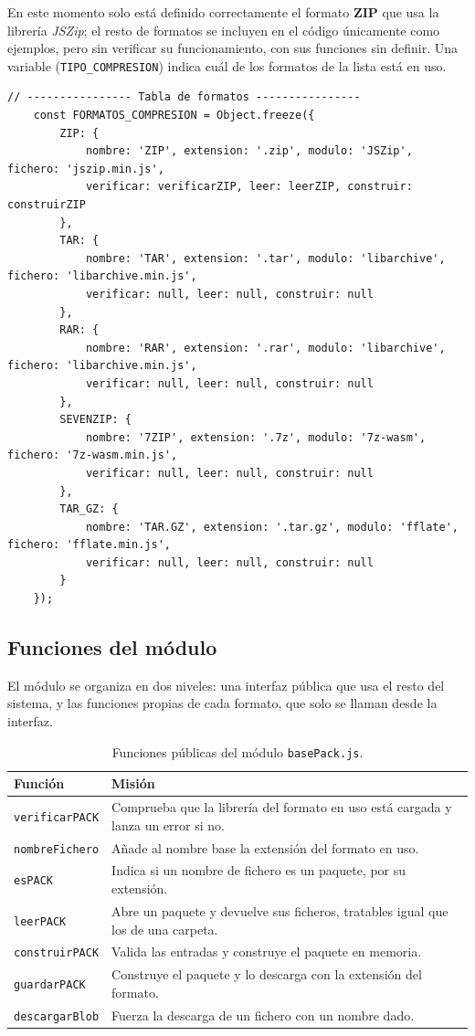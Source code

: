 En este momento solo está definido correctamente el formato \textbf{ZIP} que usa la librería \emph{JSZip}; el resto de formatos se incluyen en el código únicamente como ejemplos, pero sin verificar su funcionamiento, con sus funciones sin definir. Una variable (\texttt{TIPO\_COMPRESION}) indica cuál de los formatos de la lista está en uso.

\begin{lstlisting}[caption={Definición de formatos de compresión}]
	// ---------------- Tabla de formatos ----------------
	const FORMATOS_COMPRESION = Object.freeze({
		ZIP: {
			nombre: 'ZIP', extension: '.zip', modulo: 'JSZip', fichero: 'jszip.min.js',
			verificar: verificarZIP, leer: leerZIP, construir: construirZIP
		},
		TAR: {
			nombre: 'TAR', extension: '.tar', modulo: 'libarchive', fichero: 'libarchive.min.js',
			verificar: null, leer: null, construir: null
		},
		RAR: {
			nombre: 'RAR', extension: '.rar', modulo: 'libarchive', fichero: 'libarchive.min.js',
			verificar: null, leer: null, construir: null
		},
		SEVENZIP: {
			nombre: '7ZIP', extension: '.7z', modulo: '7z-wasm', fichero: '7z-wasm.min.js',
			verificar: null, leer: null, construir: null
		},
		TAR_GZ: {
			nombre: 'TAR.GZ', extension: '.tar.gz', modulo: 'fflate', fichero: 'fflate.min.js',
			verificar: null, leer: null, construir: null
		}
	});
\end{lstlisting}

\subsection{Funciones del módulo}
\label{sec:F5I11Funciones}

El módulo se organiza en dos niveles: una interfaz pública que usa el resto del sistema, y las funciones propias de cada formato, que solo se llaman desde la interfaz.

\begin{table}[h]
	\centering
	\begin{tabular}{|l|p{9cm}|}
		\hline
		\textbf{Función} & \textbf{Misión} \\ \hline
		\texttt{verificarPACK} & Comprueba que la librería del formato en uso está cargada y lanza un error si no. \\ \hline
		\texttt{nombreFichero} & Añade al nombre base la extensión del formato en uso. \\ \hline
		\texttt{esPACK} & Indica si un nombre de fichero es un paquete, por su extensión. \\ \hline
		\texttt{leerPACK} & Abre un paquete y devuelve sus ficheros, tratables igual que los de una carpeta. \\ \hline
		\texttt{construirPACK} & Valida las entradas y construye el paquete en memoria. \\ \hline
		\texttt{guardarPACK} & Construye el paquete y lo descarga con la extensión del formato. \\ \hline
		\texttt{descargarBlob} & Fuerza la descarga de un fichero con un nombre dado. \\ \hline
	\end{tabular}
	\caption{Funciones públicas del módulo \texttt{basePack.js}.}
\end{table}

